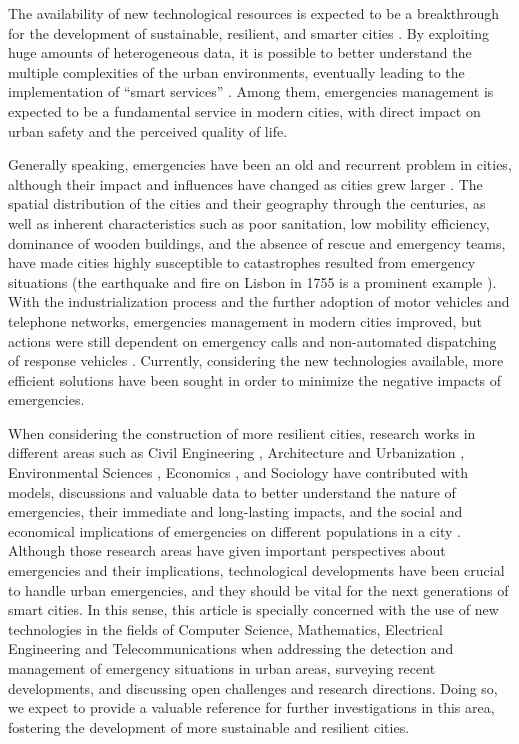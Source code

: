 \begin{refsection}
The availability of new technological resources is expected to be a breakthrough for the development of sustainable, resilient, and smarter cities \cite{smartcities4}. By exploiting huge amounts of heterogeneous data, it is possible to better understand the multiple complexities of the urban environments, eventually leading to the implementation of ``smart services'' \cite{citiesvehicles,citiesdata,twitterDetection2}. Among them, emergencies management is expected to be a fundamental service in modern cities, with direct impact on urban safety and the perceived quality of life.

Generally speaking, emergencies have been an old and recurrent problem in cities, although their impact and influences have changed as cities grew larger \cite{emergenciesmetric1}. The spatial distribution of the cities and their geography through the centuries, as well as inherent characteristics such as poor sanitation, low mobility efficiency, dominance of wooden buildings, and the absence of rescue and emergency teams, have made cities highly susceptible to catastrophes resulted from emergency situations (the earthquake and fire on Lisbon in 1755 is a prominent example \cite{lisbon}). With the industrialization process and the further adoption of motor vehicles and telephone networks, emergencies management in modern cities improved, but actions were still dependent on emergency calls and non-automated dispatching of response vehicles \cite{fireevolution}. Currently, considering the new technologies available, more efficient solutions have been sought in order to minimize the negative impacts of emergencies.

When considering the construction of more resilient cities, research works in different areas such as Civil Engineering \cite{civilengineering1,civilengineering2}, Architecture and Urbanization \cite{architecture1,architecture2}, Environmental Sciences \cite{enviroment1,enviroment2}, Economics \cite{economics1,economics2}, and Sociology \cite{sociology1,sociology2} have contributed with models, discussions and valuable data to better understand the nature of emergencies, their immediate and long-lasting impacts, and the social and economical implications of emergencies on different populations in a city \cite{emergenciesmetric1,citiesemergencies1}. Although those research areas have given important perspectives about emergencies and their implications, technological developments have been crucial to handle urban emergencies, and they should be vital for the next generations of smart cities. In this sense, this article is specially concerned with the use of new technologies in the fields of Computer Science, Mathematics, Electrical Engineering and Telecommunications when addressing the detection and management of emergency situations in urban areas, surveying recent developments, and discussing open challenges and research directions. Doing so, we expect to provide a valuable reference for further investigations in this area, fostering the development of more sustainable and resilient cities. 


\end{refsection}

